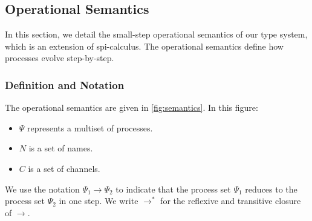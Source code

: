 \documentclass[master,english]{kuisthesis}
\theoremstyle{definition}
\begin{document}
\subsection{Operational Semantics}
In this section, we detail the small-step operational semantics of our type system, which is an extension of spi-calculus. The operational semantics define how processes evolve step-by-step.

\subsubsection{Definition and Notation}

The operational semantics are given in \autoref{fig:semantics}. In this figure:
\begin{itemize}
    \item \(\Psi\) represents a multiset of processes.
    \item \(N\) is a set of names.
    \item \(C\) is a set of channels.
\end{itemize}

We use the notation \(\Psi_1 \to \Psi_2\) to indicate that the process set \(\Psi_1\) reduces to the process set \(\Psi_2\) in one step. We write $\to^*$ for
the reflexive and transitive closure of $\to$.
\end{document}

